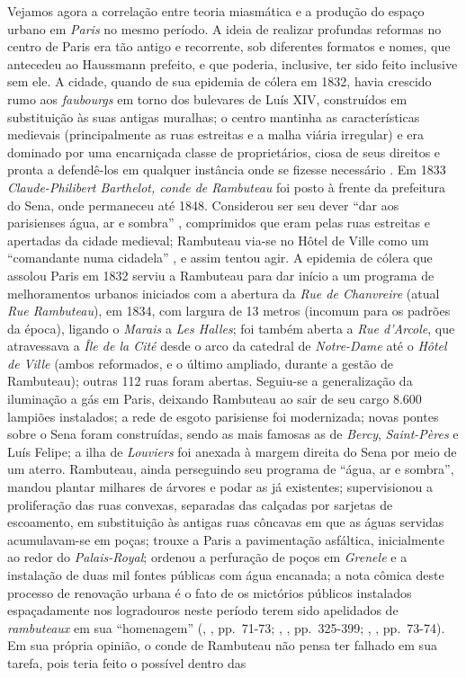 Vejamos agora a correlação entre teoria miasmática e a produção do espaço urbano em \textit{Paris} no mesmo período. A ideia de realizar profundas reformas no centro de Paris era tão antigo e recorrente, sob diferentes formatos e nomes, que antecedeu ao Haussmann prefeito, e que poderia, inclusive, ter sido feito inclusive sem ele. A cidade, quando de sua epidemia de cólera em 1832, havia crescido rumo aos \textit{faubourgs} em torno dos bulevares de Luís XIV, construídos em substituição às suas antigas muralhas; o centro mantinha as características medievais (principalmente as ruas estreitas e a malha viária irregular) e era dominado por uma encarniçada classe de proprietários, ciosa de seus direitos e pronta a defendê-los em qualquer instância onde se fizesse necessário \cite{faure_paris_2004}. Em 1833 \textit{Claude-Philibert Barthelot, conde de Rambuteau} foi posto à frente da prefeitura do Sena, onde permaneceu até 1848. Considerou ser seu dever ``dar aos parisienses água, ar e sombra'' \cite[p.~269]{rambuteau1905memoires}, comprimidos que eram pelas ruas estreitas e apertadas da cidade medieval; Rambuteau via-se no Hôtel de Ville como um ``comandante numa cidadela'' \cite[p.~269]{rambuteau1905memoires}, e assim tentou agir. A epidemia de cólera que assolou Paris em 1832 serviu a Rambuteau para dar início a um programa de melhoramentos urbanos iniciados com a abertura da \textit{Rue de Chanvreire} (atual \textit{Rue Rambuteau}), em 1834, com largura de 13 metros (incomum para os padrões da época), ligando o \textit{Marais} a \textit{Les Halles}; foi também aberta a \textit{Rue d'Arcole}, que atravessava a \textit{Île de la Cité} desde o arco da catedral de \textit{Notre-Dame} até o \textit{Hôtel de Ville} (ambos reformados, e o último ampliado, durante a gestão de Rambuteau); outras 112 ruas foram abertas. Seguiu-se a generalização da iluminação a gás em Paris, deixando Rambuteau ao sair de seu cargo 8.600 lampiões instalados; a rede de esgoto parisiense foi modernizada; novas pontes sobre o Sena foram construídas, sendo as mais famosas as de \textit{Bercy}, \textit{Saint-Pères} e Luís Felipe; a ilha de \textit{Louviers} foi anexada à margem direita do Sena por meio de um aterro. Rambuteau, ainda perseguindo seu programa de ``água, ar e sombra'', mandou plantar milhares de árvores e podar as já existentes; supervisionou a proliferação das ruas convexas, separadas das calçadas por sarjetas de escoamento, em substituição às antigas ruas côncavas em que as águas servidas acumulavam-se em poças; trouxe a Paris a pavimentação asfáltica, inicialmente ao redor do \textit{Palais-Royal}; ordenou a perfuração de poços em \textit{Grenele} e a instalação de duas mil fontes públicas com água encanada; a nota cômica deste processo de renovação urbana é o fato de os mictórios públicos instalados espaçadamente nos logradouros neste período terem sido apelidados de \textit{rambuteaux} em sua ``homenagem'' (\citeauthor{combeau_paris_2011}, \citeyear{combeau_paris_2011}, pp.~71-73; \citeauthor{rambuteau1905memoires}, \citeyear{rambuteau1905memoires}, pp.~325-399; \citeauthor{petti_eurfranba_2011}, \citeyear{petti_eurfranba_2011}, pp.~73-74). Em sua própria opinião, o conde de Rambuteau não pensa ter falhado em sua tarefa, pois teria feito o possível dentro das 